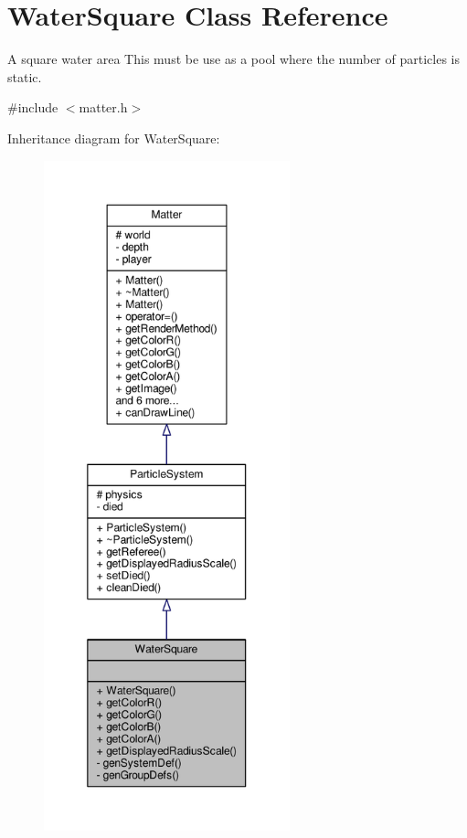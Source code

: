 \hypertarget{classWaterSquare}{}\section{Water\+Square Class Reference}
\label{classWaterSquare}


A square water area This must be use as a pool where the number of particles is static.  




{\ttfamily \#include $<$matter.\+h$>$}



Inheritance diagram for Water\+Square\+:
\nopagebreak
\begin{figure}[H]
\begin{center}
\leavevmode
\includegraphics[height=550pt]{classWaterSquare__inherit__graph}
\end{center}
\end{figure}


